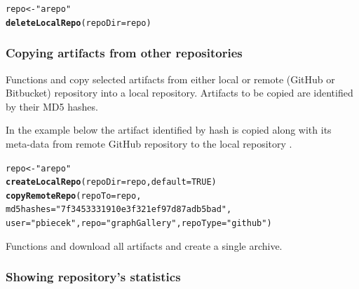 \documentclass[nojss]{jss}\usepackage[]{graphicx}\usepackage[]{color}
\makeatletter
\newcommand{\hlnum}[1]{\textcolor[rgb]{0.686,0.059,0.569}{#1}}%
\newcommand{\hlstr}[1]{\textcolor[rgb]{0.192,0.494,0.8}{#1}}%
\newcommand{\hlstd}[1]{\textcolor[rgb]{0.345,0.345,0.345}{#1}}%
\newcommand{\hlkwb}[1]{\textcolor[rgb]{0.69,0.353,0.396}{#1}}%
\newcommand{\hlkwc}[1]{\textcolor[rgb]{0.333,0.667,0.333}{#1}}%
\newcommand{\hlkwd}[1]{\textcolor[rgb]{0.737,0.353,0.396}{\textbf{#1}}}%
\newenvironment{kframe}{%
 \def\at@end@of@kframe{}%
 \ifinner\ifhmode%
  \def\at@end@of@kframe{\end{minipage}}%
  \begin{minipage}{\columnwidth}%
 \fi\fi%
 \def\FrameCommand##1{\hskip\@totalleftmargin \hskip-\fboxsep
 \colorbox{shadecolor}{##1}\hskip-\fboxsep
     \hskip-\linewidth \hskip-\@totalleftmargin \hskip\columnwidth}%
 \MakeFramed {\advance\hsize-\width
   \@totalleftmargin\z@ \linewidth\hsize
   \@setminipage}}%
 {\par\unskip\endMakeFramed%
 \at@end@of@kframe}
\newenvironment{knitrout}{}{} %
\makeatother
\begin{document}
\begin{knitrout}
\color{fgcolor}\begin{kframe}
\begin{alltt}
\hlstd{repo} \hlkwb{<-} \hlstr{"arepo"}
\hlkwd{deleteLocalRepo}\hlstd{(}\hlkwc{repoDir} \hlstd{= repo)}
\end{alltt}
\end{kframe}
\end{knitrout}

\subsubsection{Copying artifacts from other repositories}

Functions  and  copy selected artifacts from either local or remote (GitHub or Bitbucket) repository into a local repository. Artifacts to be copied are identified by their MD5 hashes. 

In the example below the artifact identified by hash {} is copied along with its meta-data from remote GitHub repository   to the local repository .

\begin{knitrout}
\color{fgcolor}\begin{kframe}
\begin{alltt}
\hlstd{repo} \hlkwb{<-} \hlstr{"arepo"}
\hlkwd{createLocalRepo}\hlstd{(}\hlkwc{repoDir} \hlstd{= repo,} \hlkwc{default} \hlstd{=} \hlnum{TRUE}\hlstd{)}
\hlkwd{copyRemoteRepo}\hlstd{(}\hlkwc{repoTo} \hlstd{= repo,}
    \hlkwc{md5hashes} \hlstd{=} \hlstr{"7f3453331910e3f321ef97d87adb5bad"}\hlstd{,}
    \hlkwc{user} \hlstd{=} \hlstr{"pbiecek"}\hlstd{,} \hlkwc{repo} \hlstd{=} \hlstr{"graphGallery"}\hlstd{,} \hlkwc{repoType} \hlstd{=} \hlstr{"github"}\hlstd{)}
\end{alltt}
\end{kframe}
\end{knitrout}

Functions  and  download all artifacts and create a single  archive.

\subsubsection{Showing repository's statistics}
\end{document}
